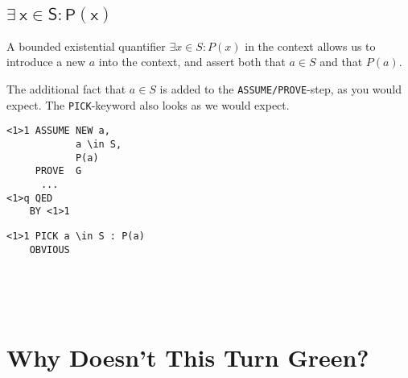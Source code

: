 \documentclass{article}
\newcommand{\code}[1]{\mathsf{#1}}
\begin{document}
\subsection{$\code{\exists\ x \in S : P(x)}$}
\vspace{10pt}
\begin{minipage}{230pt}
A bounded existential quantifier $\exists x \in S : P(x)$ in the context
allows us to introduce a new $a$ into the context, and assert both 
that $a \in S$ and that $P(a)$.

\vspace{5pt}

The additional fact that $a \in S$ is added to the
\verb|ASSUME/PROVE|-step, as you would expect. 
The \verb|PICK|-keyword also looks as we would expect. 
\end{minipage}
%
\hspace{15pt} \vline \hspace{5pt}
%
%
\begin{minipage}{100pt}
\begin{verbatim}
<1>1 ASSUME NEW a,
            a \in S,
            P(a)
     PROVE  G
      ...
<1>q QED
    BY <1>1
\end{verbatim}
\end{minipage}
\hspace{10pt} \vline \hspace{10pt}
\begin{minipage}{80pt}
\begin{verbatim}
<1>1 PICK a \in S : P(a)
    OBVIOUS





\end{verbatim}
\end{minipage}










\newpage
\section{Why Doesn't This Turn Green?}
\end{document}
